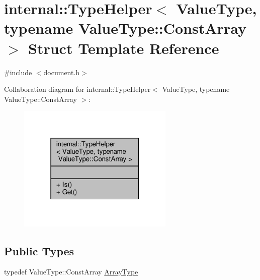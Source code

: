 \hypertarget{structinternal_1_1TypeHelper_3_01ValueType_00_01typename_01ValueType_1_1ConstArray_01_4}{}\section{internal\+:\+:Type\+Helper$<$ Value\+Type, typename Value\+Type\+:\+:Const\+Array $>$ Struct Template Reference}
\label{structinternal_1_1TypeHelper_3_01ValueType_00_01typename_01ValueType_1_1ConstArray_01_4}


{\ttfamily \#include $<$document.\+h$>$}



Collaboration diagram for internal\+:\+:Type\+Helper$<$ Value\+Type, typename Value\+Type\+:\+:Const\+Array $>$\+:
\nopagebreak
\begin{figure}[H]
\begin{center}
\leavevmode
\includegraphics[width=211pt]{structinternal_1_1TypeHelper_3_01ValueType_00_01typename_01ValueType_1_1ConstArray_01_4__coll__graph}
\end{center}
\end{figure}
\subsection*{Public Types}
\begin{DoxyCompactItemize}
\item 
typedef Value\+Type\+::\+Const\+Array \hyperlink{structinternal_1_1TypeHelper_3_01ValueType_00_01typename_01ValueType_1_1ConstArray_01_4_a88c3a7bbff09fdd44ce6980f8122ba05}{Array\+Type}
\end{DoxyCompactItemize}
